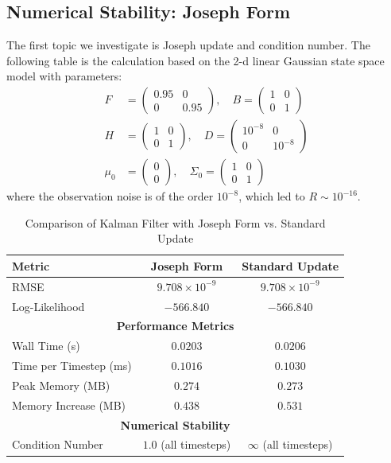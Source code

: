 \documentclass{article}
\begin{document}
\subsection{Numerical Stability: Joseph Form}
The first topic we investigate is Joseph update and condition number. The following table is the calculation based on the 2-d linear Gaussian state space model with parameters:
\begin{align*}
F &= \begin{pmatrix} 0.95 & 0 \\ 0 & 0.95 \end{pmatrix}, \quad
B = \begin{pmatrix} 1 & 0 \\ 0 & 1 \end{pmatrix} \\
H &= \begin{pmatrix} 1 & 0 \\ 0 & 1 \end{pmatrix}, \quad
D = \begin{pmatrix} 10^{-8} & 0 \\ 0 & 10^{-8} \end{pmatrix} \\
\mu_0 &= \begin{pmatrix} 0 \\ 0 \end{pmatrix}, \quad
\Sigma_0 = \begin{pmatrix} 1 & 0 \\ 0 & 1 \end{pmatrix}
\end{align*}
where the observation noise is of the order $10^{-8}$, which led to $R \sim 10^{-16}$.
\begin{table}[H]
\centering
\caption{Comparison of Kalman Filter with Joseph Form vs. Standard Update}
\begin{tabular}{lcc}
\hline
\textbf{Metric} & \textbf{Joseph Form} & \textbf{Standard Update} \\ 
\hline
RMSE & $9.708 \times 10^{-9}$ & $9.708 \times 10^{-9}$ \\
Log-Likelihood & $-566.840$ & $-566.840$ \\
\hline
\multicolumn{3}{c}{\textbf{Performance Metrics}} \\
\hline
Wall Time (s) & $0.0203$ & $0.0206$ \\
Time per Timestep (ms) & $0.1016$ & $0.1030$ \\
Peak Memory (MB) & $0.274$ & $0.273$ \\
Memory Increase (MB) & $0.438$ & $0.531$ \\
\hline
\multicolumn{3}{c}{\textbf{Numerical Stability}} \\
\hline
Condition Number & $1.0$ (all timesteps) & $\infty$ (all timesteps) \\
\hline
\end{tabular}
\end{table}
\end{document}
